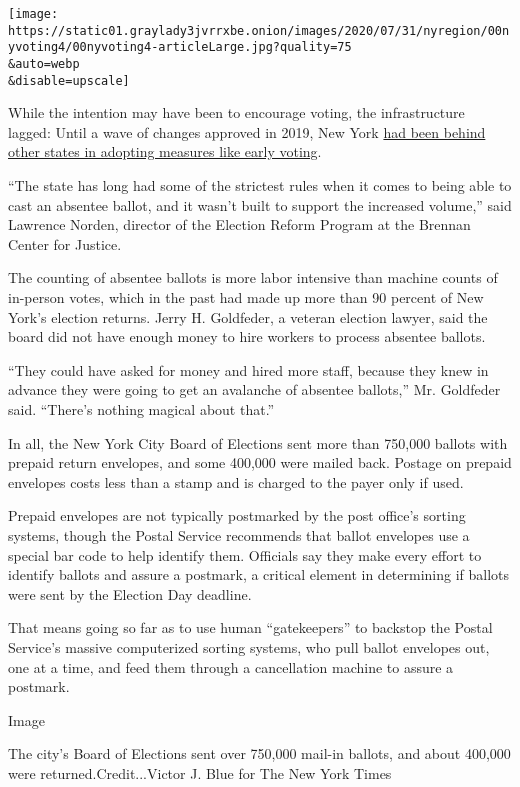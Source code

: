 \texttt{[image: https://static01.graylady3jvrrxbe.onion/images/2020/07/31/nyregion/00nyvoting4/00nyvoting4-articleLarge.jpg?quality=75\\\&auto=webp\\\&disable=upscale]}

While the intention may have been to encourage voting, the
infrastructure lagged: Until a wave of changes approved in 2019, New
York
\href{https://www.nytimes3xbfgragh.onion/2019/01/10/nyregion/voting-reform-election-ny.html}{had
been behind other states in adopting measures like early voting}.

``The state has long had some of the strictest rules when it comes to
being able to cast an absentee ballot, and it wasn't built to support
the increased volume,'' said Lawrence Norden, director of the Election
Reform Program at the Brennan Center for Justice.

The counting of absentee ballots is more labor intensive than machine
counts of in-person votes, which in the past had made up more than 90
percent of New York's election returns. Jerry H. Goldfeder, a veteran
election lawyer, said the board did not have enough money to hire
workers to process absentee ballots.

``They could have asked for money and hired more staff, because they
knew in advance they were going to get an avalanche of absentee
ballots,'' Mr. Goldfeder said. ``There's nothing magical about that.''

In all, the New York City Board of Elections sent more than 750,000
ballots with prepaid return envelopes, and some 400,000 were mailed
back. Postage on prepaid envelopes costs less than a stamp and is
charged to the payer only if used.

Prepaid envelopes are not typically postmarked by the post office's
sorting systems, though the Postal Service recommends that ballot
envelopes use a special bar code to help identify them. Officials say
they make every effort to identify ballots and assure a postmark, a
critical element in determining if ballots were sent by the Election Day
deadline.

That means going so far as to use human ``gatekeepers'' to backstop the
Postal Service's massive computerized sorting systems, who pull ballot
envelopes out, one at a time, and feed them through a cancellation
machine to assure a postmark.

Image

The city's Board of Elections sent over 750,000 mail-in ballots, and
about 400,000 were returned.Credit...Victor J. Blue for The New York
Times

